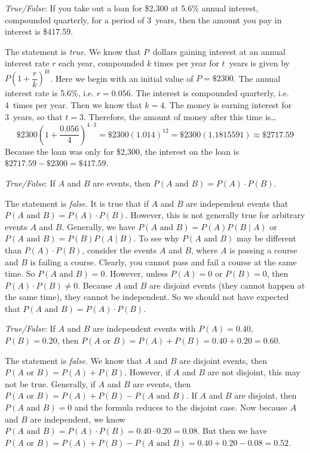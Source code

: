 \documentclass[11pt,letterpaper]{article}
\begin{document}
\quizsol \textit{True/False}: If you take out a loan for \$2,300 at 5.6\% annual interest, compounded quarterly, for a period of 3~years, then the amount you pay in interest is \$417.59. \pspace

\sol The statement is \textit{true}. We know that $P$~dollars gaining interest at an annual interest rate $r$ each year, compounded $k$ times per year for $t$~years is given by $P \left(1 + \dfrac{r}{k} \right)^{kt}$. Here we begin with an initial value of $P= \$2300$. The annual interest rate is 5.6\%, i.e. $r= 0.056$. The interest is compounded quarterly, i.e. 4~times per year. Then we know that $k= 4$. The money is earning interest for 3~years, so that $t= 3$. Therefore, the amount of money after this time is\dots
	\[
	\$2300 \left(1 + \dfrac{0.056}{4} \right)^{4 \cdot 3}= \$2300 \left(1.014 \right)^{12}= \$2300(1.1815591) \approx \$2717.59
	\]
Because the loan was only for \$2,300, the interest on the loan is $\$2717.59 - \$2300= \$417.59$. \pvspace{1.5cm}



\quizsol \textit{True/False}: If $A$ and $B$ are events, then $P(A \text{ and } B)= P(A) \cdot P(B)$. \pspace

\sol The statement is \textit{false}. It is true that if $A$ and $B$ are independent events that $P(A \text{ and } B)= P(A) \cdot P(B)$. However, this is not generally true for arbitrary events $A$ and $B$. Generally, we have $P(A \text{ and } B)= P(A) P(B \;|\; A)$ or $P(A \text{ and } B)= P(B) P(A \;|\; B)$. To see why $P(A \text{ and } B)$ may be different than $P(A) \cdot P(B)$, consider the events $A$ and $B$, where $A$ is passing a course and $B$ is failing a course. Clearly, you cannot pass and fail a course at the same time. So $P(A \text{ and } B)= 0$. However, unless $P(A)= 0$ or $P(B)= 0$, then $P(A) \cdot P(B) \neq 0$. Because $A$ and $B$ are disjoint events (they cannot happen at the same time), they cannot be independent. So we should not have expected that $P(A \text{ and } B)= P(A) \cdot P(B)$.  





\newpage





\quizsol \textit{True/False}: If $A$ and $B$ are independent events with $P(A)= 0.40$, $P(B)= 0.20$, then $P(A \text{ or } B)= P(A) + P(B)= 0.40 + 0.20= 0.60$. \pspace

\sol The statement is \textit{false}. We know that $A$ and $B$ are disjoint events, then $P(A \text{ or } B)= P(A) + P(B)$. However, if $A$ and $B$ are not disjoint, this may not be true. Generally, if $A$ and $B$ are events, then $P(A \text{ or } B)= P(A) + P(B) - P(A \text{ and } B)$. If $A$ and $B$ are disjoint, then $P(A \text{ and } B)= 0$ and the formula reduces to the disjoint case. Now because $A$ and $B$ are independent, we know $P(A \text{ and } B)= P(A) \cdot P(B)= 0.40 \cdot 0.20= 0.08$. But then we have $P(A \text{ or } B)= P(A) + P(B) - P(A \text{ and } B)= 0.40 + 0.20 - 0.08= 0.52$. 



\end{document}

